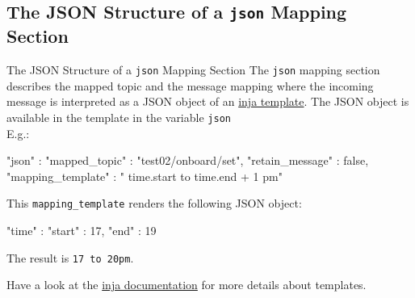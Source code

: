 ﻿\subsection{The JSON Structure of a \texttt{json} Mapping Section}

\begin{frame}[fragile]{The JSON Structure of a \texttt{json} Mapping Section}
  The \textcolor{fh-ooe-red}{\texttt{json}} mapping section describes the \textcolor{fh-ooe-red}{mapped topic} and the \textcolor{fh-ooe-red}{message mapping} where the \textcolor{fh-ooe-red}{incoming message} is \textcolor{fh-ooe-red}{interpreted as a JSON object} of an \textcolor{fh-ooe-red}{\href{https://github.com/pantor/inja/tree/master}{inja template}}. The \textcolor{fh-ooe-red}{JSON object} is available in the template in the variable \texttt{\textcolor{fh-ooe-red}{json}}\\E.g.:

  \begin{jsoncode}[gobble=4]
    "json" : {
        "mapped_topic" : "test02/onboard/set",
        "retain_message" : false,
        "mapping_template" : "{{ time.start }} to {{ time.end + 1 }}pm"
    }
  \end{jsoncode}
  This \texttt{\textcolor{fh-ooe-red}{mapping\_template}} renders the following JSON object:

  \begin{jsoncode}[gobble=4]
    {
        "time" : {
            "start" : 17,
            "end" : 19
        }
    }
  \end{jsoncode}
  The result is \texttt{\textcolor{fh-ooe-red}{17 to 20pm}}.

  Have a look at the \textcolor{fh-ooe-red}{\href{https://github.com/pantor/inja/tree/master}{inja documentation}} for more details about templates.
\end{frame}

